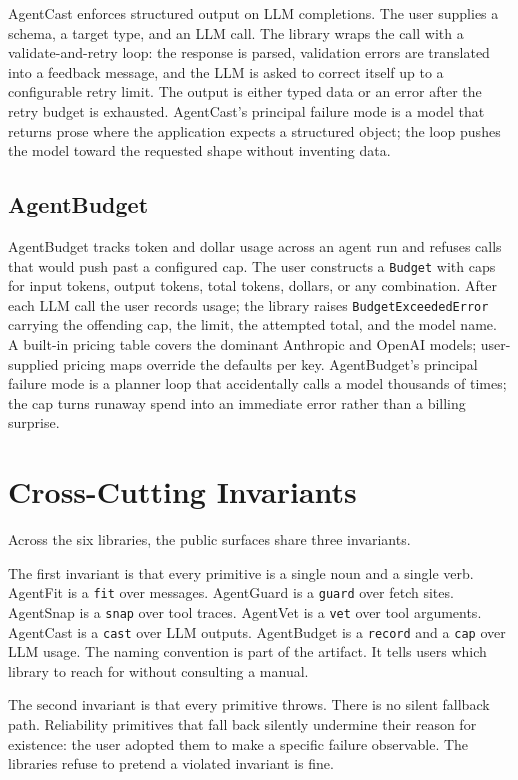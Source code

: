 \documentclass[11pt]{article}
\begin{document}
AgentCast enforces structured output on LLM completions. The user supplies a schema, a target type, and an LLM call. The library wraps the call with a validate-and-retry loop: the response is parsed, validation errors are translated into a feedback message, and the LLM is asked to correct itself up to a configurable retry limit. The output is either typed data or an error after the retry budget is exhausted. AgentCast's principal failure mode is a model that returns prose where the application expects a structured object; the loop pushes the model toward the requested shape without inventing data.

\subsection{AgentBudget}


AgentBudget tracks token and dollar usage across an agent run and refuses calls that would push past a configured cap. The user constructs a \texttt{Budget} with caps for input tokens, output tokens, total tokens, dollars, or any combination. After each LLM call the user records usage; the library raises \texttt{BudgetExceededError} carrying the offending cap, the limit, the attempted total, and the model name. A built-in pricing table covers the dominant Anthropic and OpenAI models; user-supplied pricing maps override the defaults per key. AgentBudget's principal failure mode is a planner loop that accidentally calls a model thousands of times; the cap turns runaway spend into an immediate error rather than a billing surprise.

\section{Cross-Cutting Invariants}


Across the six libraries, the public surfaces share three invariants.

The first invariant is that every primitive is a single noun and a single verb. AgentFit is a \texttt{fit} over messages. AgentGuard is a \texttt{guard} over fetch sites. AgentSnap is a \texttt{snap} over tool traces. AgentVet is a \texttt{vet} over tool arguments. AgentCast is a \texttt{cast} over LLM outputs. AgentBudget is a \texttt{record} and a \texttt{cap} over LLM usage. The naming convention is part of the artifact. It tells users which library to reach for without consulting a manual.

The second invariant is that every primitive throws. There is no silent fallback path. Reliability primitives that fall back silently undermine their reason for existence: the user adopted them to make a specific failure observable. The libraries refuse to pretend a violated invariant is fine.
\end{document}
